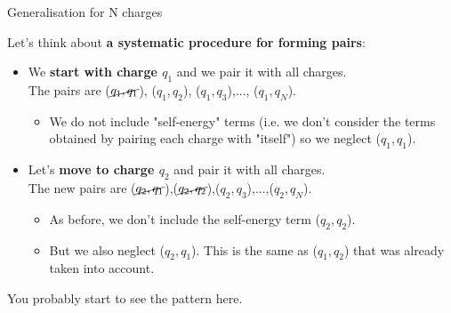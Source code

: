 \begin{frame}{Generalisation for N charges}

Let's think about {\bf a systematic procedure for forming pairs}:\\
\vspace{0.2cm}

\begin{itemize}
  \item We {\bf start with charge $q_1$} and we pair it with all charges.\\
        \vspace{0.2cm}
        The pairs are {\color{red}($\cancel{q_1,q_1}$), ($q_1,q_2$), ($q_1,q_3$),..., ($q_1,q_N$)}.\\
        \vspace{0.2cm}
        \begin{itemize}
           \item We do not include "self-energy" terms
                 (i.e. we don't consider the terms obtained by pairing each charge with "itself")
                 so we neglect ($q_1,q_1$).
        \end{itemize}
  \vspace{0.3cm}
  \item Let's {\bf move to charge $q_2$} and pair it with all charges.\\
        \vspace{0.2cm}
        The new pairs are {\color{red}($\cancel{q_2,q_1}$),($\cancel{q_2,q_2}$),($q_2,q_3$),...,($q_2,q_N$)}.
        \vspace{0.2cm}
        \begin{itemize}
           \item As before, we don't include the self-energy term ($q_2,q_2$).
           \item But we also neglect ($q_2,q_1$). This is the same as  ($q_1,q_2$) that was already taken into account.
        \end{itemize}
\end{itemize}

\vspace{0.3cm}
You probably start to see the pattern here.

\end{frame}

%
%
%

